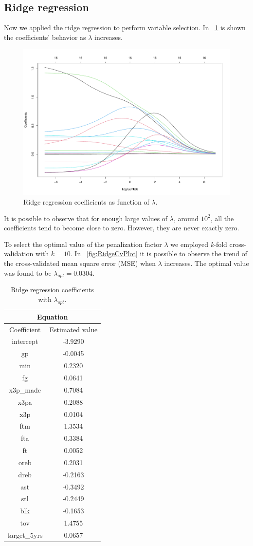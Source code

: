 \subsection{Ridge regression}

Now we applied the ridge regression to perform variable selection. In \Fig~\ref{fig:RidgeCoefVsLambda} is shown the coefficients' behavior as $\lambda$ increases. 

\begin{figure}[h]
	\centering
	\includegraphics[width=0.4\linewidth]{ImageFiles/Regression/Ridge/RidgeCoefVsLambda}
	\caption{Ridge regression coefficients as function of $\lambda$.}
	\label{fig:RidgeCoefVsLambda}
\end{figure}

It is possible to observe that for enough large values of $\lambda$, around $10^2$, all the coefficients tend to become close to zero. However, they are never exactly zero.

To select the optimal value of the penalization factor $\lambda$ we employed \textit{k}-fold cross-validation with $\textit{k}=10$. In \Fig~\ref{fig:RidgeCvPlot} it is possible to observe the trend of the cross-validated mean square error (MSE) when $\lambda$ increases. The optimal value was found to be $\lambda_{opt} = 0.0304$.

\begin{table}[h]
	\centering
	\begin{tabular}{||c | c ||} 
		\hline
		\multicolumn{2}{|c|}{Equation} \\
		\hline
		Coefficient & Estimated value \\
		\hline
		intercept & -3.9290 \\
		gp & -0.0045 \\
		min & 0.2320 \\
		fg & 0.0641 \\
		x3p\_made & 0.7084 \\
		x3pa & 0.2088 \\
		x3p & 0.0104 \\
		ftm & 1.3534 \\
		fta & 0.3384 \\
		ft & 0.0052 \\
		oreb & 0.2031 \\
		dreb & -0.2163 \\
		ast & -0.3492 \\			
		stl & -0.2449 \\
		blk & -0.1653 \\
		tov & 1.4755 \\
		target\_5yrs & 0.0657 \\				
		\hline
	\end{tabular}
	\caption{Ridge regression coefficients with $\lambda_{opt}$.}
	\label{table:FinalRidgeCoef}
\end{table}


